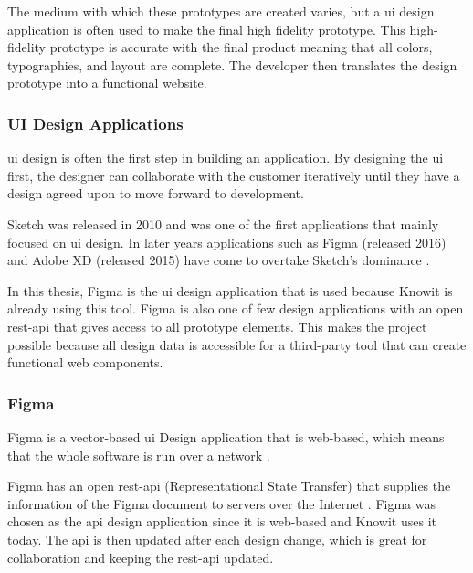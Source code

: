 The medium with which these prototypes are created varies, but a \acrfull{ui} design application is often used to make the final high fidelity prototype. This high-fidelity prototype is accurate with the final product meaning that all colors, typographies, and layout are complete. The developer then translates the design prototype into a functional website.

\subsubsection{UI Design Applications}%
\label{ssub:Apps}
\acrshort{ui} design is often the first step in building an application. By designing the \acrshort{ui} first, the designer can collaborate with the customer iteratively until they have a design agreed upon to move forward to development.

Sketch \cite{sketchDigitalDesignToolkit} was released in 2010 and was one of the first applications that mainly focused on \acrshort{ui} design. In later years applications such as Figma \cite{figmaFigmaCollaborativeInterface}  (released 2016) and Adobe XD \cite{adobeAdobeXDFast} (released 2015) have come to overtake Sketch's dominance \cite{SketchVsFigma0200}. 

In this thesis, Figma is the \acrshort{ui} design application that is used because Knowit is already using this tool. Figma is also one of few design applications with an open \acrshort{rest}-\acrshort{api} that gives access to all prototype elements. This makes the project possible because all design data is accessible for a third-party tool that can create functional web components.  

 






\subsubsection{Figma}%
\label{sub:Figma}
Figma is a vector-based \acrshort{ui} Design application that is web-based, which means that the whole software is run over a network \cite{FigmaCollaborativeInterface} . 

Figma has an open \acrshort{rest}-\acrshort{api} (Representational State Transfer) that supplies the information of the Figma document to servers over the Internet \cite{figmaFigma, RepresentationalStateTransfer2021}. Figma was chosen as the \acrshort{api} design application since it is web-based and Knowit uses it today. The \acrshort{api} is then updated after each design change, which is great for collaboration and keeping the \acrshort{rest}-\acrshort{api} updated.

